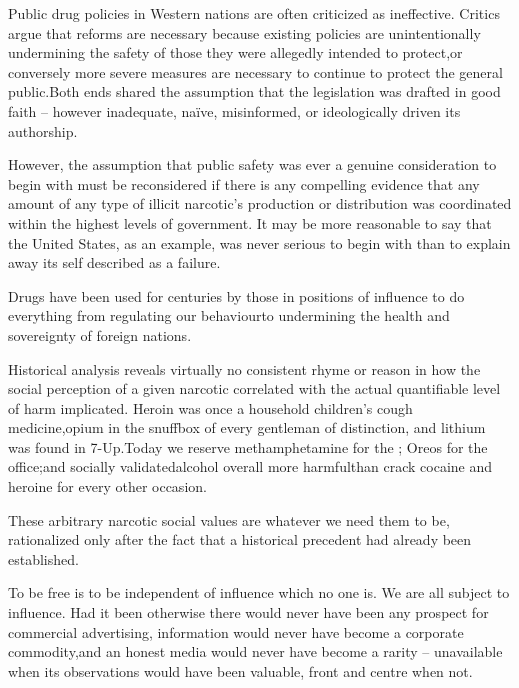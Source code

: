 Public drug policies in Western nations are often criticized as ineffective. Critics argue that reforms are necessary because existing policies are unintentionally undermining the safety of those they were allegedly intended to protect, or conversely more severe measures are necessary to continue to protect the general public. Both ends shared the assumption that the legislation was drafted in good faith -- however inadequate, naïve, misinformed, or ideologically driven its authorship. 

However, the assumption that public safety was ever a genuine consideration to begin with must be reconsidered if there is any compelling evidence that any amount of any type of illicit narcotic's production or distribution was coordinated within the highest levels of government. It may be more reasonable to say that the United States, as an example, was never serious to begin with than to explain away its self described  as a failure.

Drugs have been used for centuries by those in positions of influence to do everything from regulating our behaviour\footnotecite[wilson2007] to undermining the health and sovereignty of foreign nations. 

Historical analysis reveals virtually no consistent rhyme or reason in how the social perception of a given narcotic correlated with the actual quantifiable level of harm implicated. Heroin was once a household children's cough medicine, opium in the snuffbox of every gentleman of distinction, and lithium was found in 7-Up. Today we reserve methamphetamine for the ; Oreos for the office; and socially validated alcohol overall more harmful\footnotecite[extras={ See figure 2.}][nutt2010] than crack cocaine and heroine for every other occasion. 

These arbitrary narcotic social values are whatever we need them to be, rationalized only after the fact that a historical precedent had already been established.


To be free is to be independent of influence which no one is. We are all subject to influence. Had it been otherwise there would never have been any prospect for commercial advertising, information would never have become a corporate commodity,\footnotecite[santoso2008]\footnotecite[nagata2011] and an honest media would never have become a rarity -- unavailable when its observations would have been valuable,
front and centre when not.

